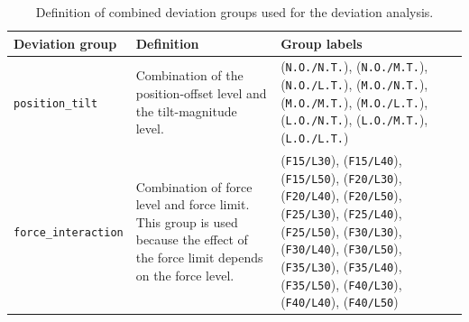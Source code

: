 \begin{table}[htbp]
    \centering
    \caption{Definition of combined deviation groups used for the deviation analysis.}
    \label{tab:deviation_group_combinations_definitions}
    \renewcommand{\arraystretch}{1.15}
    \begin{tabular}{p{} p{} p{}}
        \toprule
        \textbf{Deviation group}
        & \textbf{Definition} 
        & \textbf{Group labels} \\
        \midrule

        \texttt{position\_tilt} 
        & Combination of the position-offset level and the tilt-magnitude level.
        & (\texttt{N.O./N.T.}), (\texttt{N.O./M.T.}), (\texttt{N.O./L.T.}),\newline
        (\texttt{M.O./N.T.}), (\texttt{M.O./M.T.}), (\texttt{M.O./L.T.}),\newline
        (\texttt{L.O./N.T.}), (\texttt{L.O./M.T.}), (\texttt{L.O./L.T.})\\

        \midrule

        \texttt{force\_interaction} 
        & Combination of force level and force limit. This group is used because the effect of the force limit depends on the force level.
        & (\texttt{F15/L30}), (\texttt{F15/L40}), (\texttt{F15/L50}),\newline
        (\texttt{F20/L30}), (\texttt{F20/L40}), (\texttt{F20/L50}),\newline
        (\texttt{F25/L30}), (\texttt{F25/L40}), (\texttt{F25/L50}),\newline
        (\texttt{F30/L30}), (\texttt{F30/L40}), (\texttt{F30/L50}),\newline
        (\texttt{F35/L30}), (\texttt{F35/L40}), (\texttt{F35/L50}),\newline
        (\texttt{F40/L30}), (\texttt{F40/L40}), (\texttt{F40/L50})\\

        \bottomrule
    \end{tabular}
\end{table}

